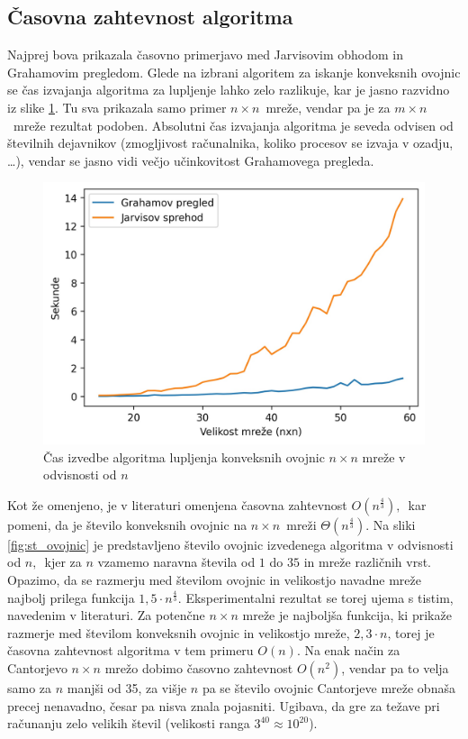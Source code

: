 \documentclass[a4paper]{article}
\begin{document}
\subsection{Časovna zahtevnost algoritma}
Najprej bova prikazala časovno primerjavo med Jarvisovim obhodom in Grahamovim pregledom. Glede na izbrani algoritem za iskanje konveksnih ovojnic se čas izvajanja algoritma za lupljenje
lahko zelo razlikuje, kar je jasno razvidno iz slike \ref{fig:cas}. Tu sva prikazala samo primer $n \times n$~mreže, vendar pa je za $m \times n$~mreže rezultat podoben. Absolutni
čas izvajanja algoritma je seveda odvisen od številnih dejavnikov (zmogljivost računalnika, koliko procesov se izvaja v ozadju, \ldots), vendar se jasno vidi
večjo učinkovitost Grahamovega pregleda.

\begin{figure}[!h]
	\centering
	\caption{Čas izvedbe algoritma lupljenja konveksnih ovojnic $n \times n$ mreže v odvisnosti od $n$}
	\label{fig:cas}
	\vspace{2mm}
	\includegraphics[scale=0.6]{slike/cas.jpg}
\end{figure}

Kot že omenjeno, je v literaturi omenjena časovna zahtevnost $O(n ^ \frac{4}{3}),$~kar pomeni, da je število konveksnih ovojnic na $n \times n$~mreži $\Theta(n ^ \frac{4}{3})$.
Na sliki \ref{fig:st_ovojnic} je predstavljeno število ovojnic izvedenega algoritma v odvisnosti od $n,$~kjer za $n$ vzamemo naravna števila od $1$ do $35$ in mreže različnih vrst. 
Opazimo, da se razmerju med številom ovojnic in velikostjo navadne mreže najbolj prilega funkcija $1,5 \cdot n ^ \frac{4}{3}.$ Eksperimentalni rezultat se torej ujema s tistim, navedenim v 
literaturi. Za potenčne $n \times n$ mreže je najboljša funkcija, ki prikaže razmerje med številom konveksnih ovojnic in velikostjo mreže, $2,3 \cdot n$, torej je časovna zahtevnost algoritma
v tem primeru $O(n)$. Na enak način za Cantorjevo $n \times n$ mrežo dobimo časovno zahtevnost $O(n^2)$, vendar pa to velja samo za $n$ manjši od 35, za višje $n$ pa se
število ovojnic Cantorjeve mreže obnaša precej nenavadno, česar pa nisva znala pojasniti. Ugibava, da gre za težave pri računanju zelo velikih števil (velikosti ranga $3^{40} \approx 10^{20}$).
\end{document}
